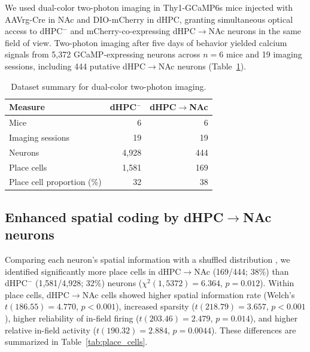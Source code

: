 \documentclass[10pt,a4paper]{article}
\begin{document}
We used dual-color two-photon imaging in Thy1-GCaMP6s mice injected with AAVrg-Cre in NAc and DIO-mCherry in dHPC, granting simultaneous optical access to dHPC$^{-}$ and mCherry-co-expressing dHPC$\rightarrow$NAc neurons in the same field of view. Two-photon imaging after five days of behavior yielded calcium signals from 5{,}372 GCaMP-expressing neurons across $n=6$ mice and 19 imaging sessions, including 444 putative dHPC$\rightarrow$NAc neurons (Table~\ref{tab:dataset}).

\begin{table}[h]
\centering
\caption{Dataset summary for dual-color two-photon imaging.}
\label{tab:dataset}
\begin{tabular}{lrr}
\toprule
Measure & dHPC$^{-}$ & dHPC$\rightarrow$NAc \\
\midrule
Mice & 6 & 6 \\
Imaging sessions & 19 & 19 \\
Neurons & 4{,}928 & 444 \\
Place cells & 1{,}581 & 169 \\
Place cell proportion (\%) & 32 & 38 \\
\bottomrule
\end{tabular}
\end{table}

\subsection{Enhanced spatial coding by dHPC$\rightarrow$NAc neurons}
Comparing each neuron's spatial information with a shuffled distribution \cite{skaggs1993information}, we identified significantly more place cells in dHPC$\rightarrow$NAc (169/444; 38\%) than dHPC$^{-}$ (1{,}581/4{,}928; 32\%) neurons ($\chi^2(1,5372)=6.364$, $p=0.012$). Within place cells, dHPC$\rightarrow$NAc cells showed higher spatial information rate (Welch's $t(186.55)=4.770$, $p<0.001$), increased sparsity \cite{jung1994comparison} ($t(218.79)=3.657$, $p<0.001$), higher reliability of in-field firing ($t(203.46)=2.479$, $p=0.014$), and higher relative in-field activity ($t(190.32)=2.884$, $p=0.0044$). These differences are summarized in Table~\ref{tab:place_cells}.
\end{document}
